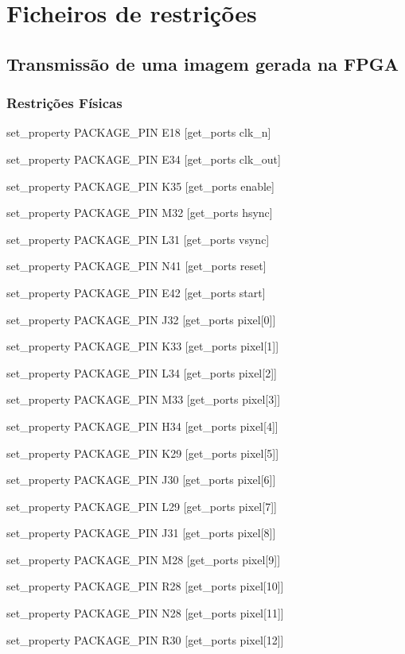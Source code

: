 {\tiny \chapter{Ficheiros de restrições} \label{ap2:codigo}}

\section{Transmissão de uma imagem gerada na FPGA} \label{ap2:planA}
%
%
\subsection{Restrições Físicas} \label{ap2:planA_physical_cnstrs}
\small{
set\_property PACKAGE\_PIN E18 [get\_ports clk\_n]

set\_property PACKAGE\_PIN E34 [get\_ports clk\_out]

set\_property PACKAGE\_PIN K35 [get\_ports enable]

set\_property PACKAGE\_PIN M32 [get\_ports hsync]

set\_property PACKAGE\_PIN L31 [get\_ports vsync]

set\_property PACKAGE\_PIN N41 [get\_ports reset]

set\_property PACKAGE\_PIN E42 [get\_ports start]

set\_property PACKAGE\_PIN J32 [get\_ports {pixel[0]}]

set\_property PACKAGE\_PIN K33 [get\_ports {pixel[1]}]

set\_property PACKAGE\_PIN L34 [get\_ports {pixel[2]}]

set\_property PACKAGE\_PIN M33 [get\_ports {pixel[3]}]

set\_property PACKAGE\_PIN H34 [get\_ports {pixel[4]}]

set\_property PACKAGE\_PIN K29 [get\_ports {pixel[5]}]

set\_property PACKAGE\_PIN J30 [get\_ports {pixel[6]}]

set\_property PACKAGE\_PIN L29 [get\_ports {pixel[7]}]

set\_property PACKAGE\_PIN J31 [get\_ports {pixel[8]}]

set\_property PACKAGE\_PIN M28 [get\_ports {pixel[9]}]

set\_property PACKAGE\_PIN R28 [get\_ports {pixel[10]}]

set\_property PACKAGE\_PIN N28 [get\_ports {pixel[11]}]

set\_property PACKAGE\_PIN R30 [get\_ports {pixel[12]}]

}
